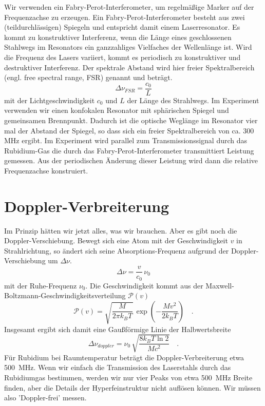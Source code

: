 Wir verwenden ein Fabry-Perot-Interferometer, um regelmäßige Marker auf der Frequenzachse zu erzeugen. Ein Fabry-Perot-Interferometer besteht aus zwei (teildurchlässigen) Spiegeln und entspricht damit einem Laserresonator. Es kommt zu konstruktiver Interferenz, wenn die Länge eines geschlossenen Stahlwegs im Resonators ein ganzzahliges Vielfaches der  Wellenlänge ist. Wird die Frequenz des Lasers variiert, kommt es periodisch zu konstruktiver und destruktiver Interferenz. Der spektrale Abstand wird hier freier Spektralbereich (engl. free spectral range, FSR) genannt und beträgt.
	\begin{equation}
	\Delta\nu_{FSR}=\frac{c_0}{L}  
	\end{equation}
mit der Lichtgeschwindigkeit $c_0$ und $L$ der Länge des Strahlwegs. Im Experiment verwenden wir einen konfokalen Resonator mit sphärischen Spiegel und gemeinsamen Brennpunkt. Dadurch ist die optische Weglänge im Resonator vier mal der Abstand der Spiegel,  so dass sich ein freier Spektralbereich von ca. 300 MHz ergibt. Im Experiment wird parallel zum Transmissionssignal durch das Rubidium-Gas die durch das Fabry-Perot-Interferometer transmittiert Leistung gemessen. Aus der periodischen Änderung dieser Leistung wird dann die relative Frequenzachse konstruiert.





\section{Doppler-Verbreiterung}

Im Prinzip hätten wir jetzt alles, was wir brauchen. Aber es gibt noch die Doppler-Verschiebung. Bewegt sich eine Atom mit der Geschwindigkeit  $v$ in Strahlrichtung, so ändert sich seine Absorptions-Frequenz aufgrund der Doppler-Verschiebung um $\Delta \nu$.
\begin{equation}
	\Delta \nu = \frac{v}{c_0} \, \nu_0
\end{equation}
mit der Ruhe-Frequenz $\nu_0$. Die Geschwindigkeit kommt  aus der  Maxwell-Boltzmann-Geschwindigkeitsverteilung $\mathcal{P}(v)$
\begin{equation}
	\mathcal{P}(v) = \sqrt{\frac{M}{2 \pi k_B T}} \, \exp \left (
	- \frac{M v^2}{2  k_B T}	
	\right) \quad .
\end{equation}
Insgesamt ergibt sich damit eine Gaußförmige  Linie der Halbwertsbreite 
\begin{equation}
	 \Delta \nu_{doppler} = \nu_0 \, \sqrt{\frac{8 k_B T \ln 2} {M c^2}} \quad .
\end{equation}
Für Rubidium bei Raumtemperatur beträgt die Doppler-Verbreiterung etwa 500~MHz. Wenn wir einfach die Transmission des Laserstahls durch das Rubidiumgas bestimmen, werden wir nur vier Peaks von etwa 500~MHz Breite finden, aber die Details der Hyperfeinstruktur nicht auflösen können. Wir müssen also 'Doppler-frei' messen.


